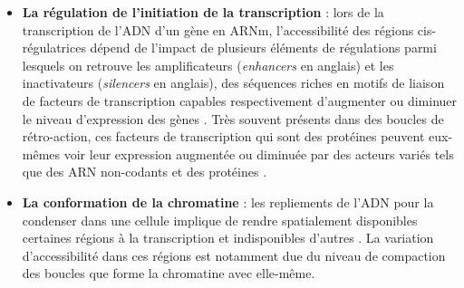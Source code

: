 \begin{itemize}
    \item \textbf{La régulation de l'initiation de la transcription} : lors de la transcription de l'ADN d'un gène en ARNm, l'accessibilité des régions cis-régulatrices dépend de l'impact de plusieurs éléments de régulations parmi lesquels on retrouve les amplificateurs (\textit{enhancers} en anglais) et les inactivateurs (\textit{silencers} en anglais), des séquences riches en motifs de liaison de facteurs de transcription capables respectivement d'augmenter ou diminuer le niveau d'expression des gènes \cite{Levo2014Jul}. Très souvent présents dans des boucles de rétro-action, ces facteurs de transcription qui sont des protéines peuvent eux-mêmes voir leur expression augmentée ou diminuée par des acteurs variés tels que des ARN non-codants et des protéines \cite{Chen2020May}.
    \item \textbf{La conformation de la chromatine} : les repliements de l'ADN pour la condenser dans une cellule implique de rendre spatialement disponibles certaines régions à la transcription et indisponibles d'autres \cite{Kadauke2009Jan}. La variation d'accessibilité dans ces régions est notamment due du niveau de compaction des boucles que forme la chromatine avec elle-même.

\end{itemize}
